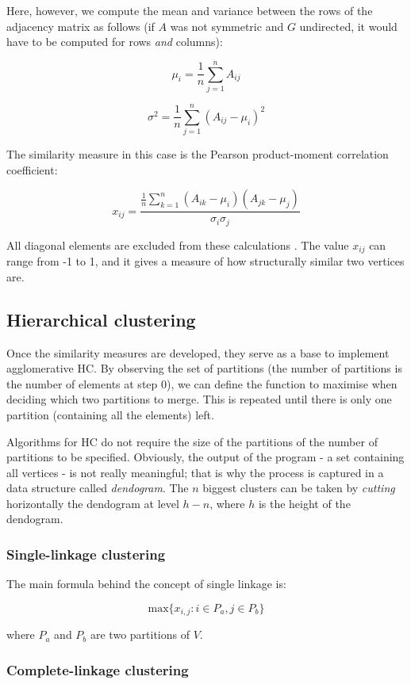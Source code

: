 \documentclass[12pt,a4paper]{article}
\begin{document}
Here, however, we compute the mean and variance between the rows of
the adjacency matrix as follows (if $A$ was not symmetric and $G$
undirected, it would have to be computed for rows \emph{and} columns):

$$ \mu_i = \frac{1}{n} \sum_{j=1}^{n} A_{ij} $$

$$ \sigma^2 = \frac{1}{n} \sum_{j=1}^{n} (A_{ij} - \mu_i)^2 $$

The similarity measure in this case is the Pearson product-moment
correlation coefficient:

$$ x_{ij} = \frac{\frac{1}{n}\sum_{k=1}^{n}(A_{ik} -
  \mu_i)(A_{jk}-\mu_j)}{\sigma_i\sigma_j} $$

All diagonal elements are excluded from these calculations
\cite[p.~369]{socionetwork}. The value $x_{ij}$ can range from -1 to
1, and it gives a measure of how structurally similar two vertices
are.

\subsection{Hierarchical clustering}

Once the similarity measures are developed, they serve as a base to
implement agglomerative HC. By observing the set of partitions (the
number of partitions is the number of elements at step 0), we can
define the function to maximise when deciding which two partitions to
merge. This is repeated until there is only one partition (containing
all the elements) left.

Algorithms for HC do not require the size of the partitions of the
number of partitions to be specified. Obviously, the output of the
program - a set containing all vertices - is not really meaningful;
that is why the process is captured in a data structure called
\emph{dendogram}. The $n$ biggest clusters can be taken by
\emph{cutting} horizontally the dendogram at level $h - n$, where $h$
is the height of the dendogram.

\subsubsection{Single-linkage clustering}

The main formula behind the concept of single linkage is:

$$ \mathrm{max}\{x_{i,j} : i \in P_a, j \in P_b\} $$

where ${P_a}$ and $P_b$ are two partitions of $V$.

\subsubsection{Complete-linkage clustering}
\end{document}
